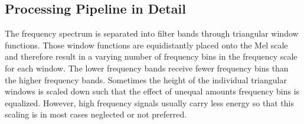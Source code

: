 
\subsection{Processing Pipeline in Detail}\label{sec:signal_mfcc_pipeline}
The frequency spectrum is separated into filter bands through triangular window functions.
Those window functions are equidistantly placed onto the Mel scale and therefore result in a varying number of frequency bins in the frequency scale for each window.
The lower frequency bands receive fewer frequency bins than the higher frequency bands.
Sometimes the height of the individual triangular windows is scaled down such that the effect of unequal amounts frequency bins is equalized.
However, high frequency signals usually carry less energy so that this scaling is in most cases neglected or not preferred.

